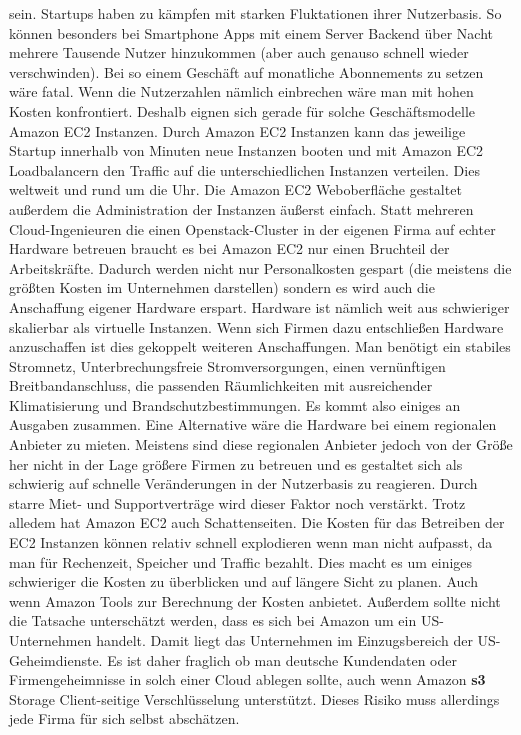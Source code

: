\documentclass[titlepage]{report}
\begin{document}
sein. Startups haben zu kämpfen mit starken Fluktationen ihrer
Nutzerbasis. So können besonders bei Smartphone Apps mit einem Server
Backend über Nacht mehrere Tausende Nutzer hinzukommen (aber auch
genauso schnell wieder verschwinden). Bei so einem Geschäft auf
monatliche Abonnements zu setzen wäre fatal. Wenn die Nutzerzahlen
nämlich einbrechen wäre man mit hohen Kosten konfrontiert. Deshalb
eignen sich gerade für solche Geschäftsmodelle Amazon EC2 Instanzen.
Durch Amazon EC2 Instanzen kann das jeweilige Startup innerhalb von
Minuten neue Instanzen booten und mit Amazon EC2 Loadbalancern den
Traffic auf die unterschiedlichen Instanzen verteilen. Dies weltweit und
rund um die Uhr. Die Amazon EC2 Weboberfläche gestaltet außerdem die
Administration der Instanzen äußerst einfach. Statt mehreren
Cloud\hyp{}Ingenieuren die einen Openstack\hyp{}Cluster in der eigenen
Firma auf echter Hardware betreuen braucht es bei Amazon EC2 nur einen
Bruchteil der Arbeitskräfte. Dadurch werden nicht nur Personalkosten
gespart (die meistens die größten Kosten im Unternehmen darstellen)
sondern es wird auch die Anschaffung eigener Hardware erspart. Hardware
ist nämlich weit aus schwieriger skalierbar als virtuelle Instanzen.
Wenn sich Firmen dazu entschließen Hardware anzuschaffen ist dies
gekoppelt weiteren Anschaffungen. Man benötigt ein stabiles Stromnetz,
Unterbrechungsfreie Stromversorgungen, einen vernünftigen
Breitbandanschluss, die passenden Räumlichkeiten mit ausreichender
Klimatisierung und Brandschutzbestimmungen. Es kommt also einiges an
Ausgaben zusammen. Eine Alternative wäre die Hardware bei einem
regionalen Anbieter zu mieten. Meistens sind diese regionalen Anbieter
jedoch von der Größe her nicht in der Lage größere Firmen zu betreuen
und es gestaltet sich als schwierig auf schnelle Veränderungen in der
Nutzerbasis zu reagieren. Durch starre Miet\hyp{} und Supportverträge
wird dieser Faktor noch verstärkt. Trotz alledem hat Amazon EC2 auch
Schattenseiten. Die Kosten für das Betreiben der EC2 Instanzen können
relativ schnell explodieren wenn man nicht aufpasst, da man für
Rechenzeit, Speicher und Traffic bezahlt. Dies macht es um einiges
schwieriger die Kosten zu überblicken und auf längere Sicht zu planen.
Auch wenn Amazon Tools zur Berechnung der Kosten
anbietet.\cite{calculator} Außerdem sollte nicht die Tatsache
unterschätzt werden, dass es sich bei Amazon um ein US\hyp{}Unternehmen
handelt. Damit liegt das Unternehmen im Einzugsbereich der
US\hyp{}Geheimdienste. Es ist daher fraglich ob man deutsche Kundendaten
oder Firmengeheimnisse in solch einer Cloud ablegen sollte, auch wenn
Amazon \textbf{s3} Storage Client\hyp{}seitige Verschlüsselung
unterstützt. Dieses Risiko muss allerdings jede Firma für sich selbst
abschätzen.
\nocite{*}
\printbibliography
\listoffigures
\end{document}
